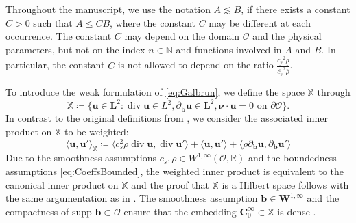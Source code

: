 \documentclass{m2an}
\newcommand{\inner}[1]{\langle #1 \rangle}
\newcommand{\innerr}[1]{\langle \rho#1 \rangle}
\newcommand{\innercsr}[1]{\langle c_s^2 \rho#1 \rangle}
\newcommand{\dom}{\mathcal{O}} %
\newcommand{\nv}{\boldsymbol{\nu}}
\newcommand{\bflow}{\mathbf{b}}
\renewcommand{\u}{\mathbf{u}}
\renewcommand{\div}{\operatorname{div}}
\newcommand{\X}{\mathbb{X}}
\newcommand{\bL}{\mathbf{L}}
\newcommand{\diffb}{\partial_{\bflow}}
\theoremstyle{plain}
\theoremstyle{definition}
\begin{document}
Throughout the manuscript, we use the notation $A \lesssim B$, if there exists a constant $C > 0$ such that $A \le CB$, where the constant $C$ may be different at each occurrence. The constant $C$ may depend on the domain $\dom$ and the physical parameters, but not on the index $n \in \mathbb{N}$ and functions involved in $A$ and $B$. In particular, the constant $C$ is not allowed to depend on the ratio $\frac{\underline{c_s}^2 \underline{\rho}}{\overline{c_s}^2 \overline{\rho}}$. 

To introduce the weak formulation of \eqref{eq:Galbrun}, we define the space $\X$ through
\begin{equation}
      \X \coloneqq \{ \u \in \bL^2 : \div \u \in L^2, \diffb \u \in \bL^2, \nv \cdot \u = 0 \text{ on } \partial \dom \}. 
\end{equation} 
In contrast to the original definitions from \cite{HH21}, we consider the associated inner product on $\X$ to be weighted:
\begin{equation*}
   \inner{\u, \u'}_{\X} \coloneqq \innercsr{\div \u, \div \u'} + \inner{\u, \u'} + \innerr{\diffb \u, \diffb \u'}
\end{equation*}
Due to the smoothness assumptions $c_s, \rho \in W^{1,\infty}(\dom,\mathbb{R})$ and the boundedness assumptions \eqref{eq:CoeffsBounded}, the weighted inner product is equivalent to the canonical inner product on $\X$ and the proof that $\X$ is a Hilbert space follows with the same argumentation as in \cite[Lem.~2.1]{HH21}. The smoothness assumption $\bflow \in \bm{W}^{1,\infty}$ and the compactness of $\text{supp } \bflow \subset \dom$ ensure that the embedding $\bm{C}^\infty_0 \subset \X$ is dense \cite[Thm.~6]{HLS22H1}. 
\end{document}
